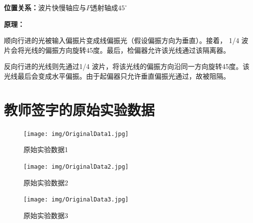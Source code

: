 \documentclass[UTF8]{ctexart}
\begin{document}
\textbf{位置关系：}波片快慢轴应与$P$透射轴成$45^{\circ}$

\textbf{原理：}

顺向行进的光被输入偏振片变成线偏振光（假设偏振方向为垂直）。接着， 1/4 波片会将光线的偏振方向旋转45度。最后，检偏器允许该光线通过该隔离器。

反向行进的光线则先通过1/4 波片，将该光线的偏振方向沿同一方向旋转45度。该光线最后会变成水平偏振。由于起偏器只允许垂直偏振光通过，故被阻隔。

\newpage
\section{教师签字的原始实验数据}

\begin{figure}[h]
    \centering
    \texttt{[image: img/OriginalData1.jpg]}
    \caption{原始实验数据1}
    \label{fig:raw_data_1}
\end{figure}

\begin{figure}[h]
    \centering
    \texttt{[image: img/OriginalData2.jpg]}
    \caption{原始实验数据2}
    \label{fig:raw_data_2}
\end{figure}

\begin{figure}[h]
    \centering
    \texttt{[image: img/OriginalData3.jpg]}
    \caption{原始实验数据3}
    \label{fig:raw_data_3}
\end{figure}
\end{document}
